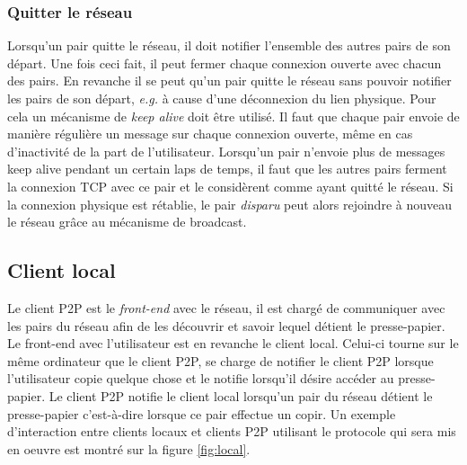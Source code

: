 \subsubsection*{Quitter le réseau}
Lorsqu'un pair quitte le réseau, il doit notifier l'ensemble des autres
pairs de son départ. Une fois ceci fait, il peut fermer chaque connexion
ouverte avec chacun des pairs. En revanche il se peut qu'un pair quitte
le réseau sans pouvoir notifier les pairs de son départ, \emph{e.g.}
à cause d'une déconnexion du lien physique. Pour cela un mécanisme
de \emph{keep alive} doit être utilisé. Il faut que chaque pair envoie
de manière régulière un message sur chaque connexion ouverte, même en cas
d'inactivité de la part de l'utilisateur. Lorsqu'un pair n'envoie plus
de messages keep alive pendant un certain laps de temps, il faut que les
autres pairs ferment la connexion TCP avec ce pair et le considèrent comme
ayant quitté le réseau. Si la connexion physique est rétablie, le pair
\emph{disparu} peut alors rejoindre à nouveau le réseau grâce au mécanisme
de broadcast.

\subsection{Client local}
Le client P2P est le \emph{front-end} avec le réseau, il est chargé
de communiquer avec les pairs du réseau afin de les découvrir et savoir
lequel détient le presse-papier. Le front-end avec l'utilisateur
est en revanche le client local. Celui-ci tourne sur le même ordinateur
que le client P2P, se charge de notifier le client P2P lorsque
l'utilisateur copie quelque chose et le notifie lorsqu'il désire
accéder au presse-papier. Le client P2P notifie le client local
lorsqu'un pair du réseau détient le presse-papier c'est-à-dire lorsque ce
pair effectue un copir.
Un exemple d'interaction entre clients locaux et clients P2P utilisant
le protocole qui sera mis en oeuvre est montré sur la figure \ref{fig:local}.

